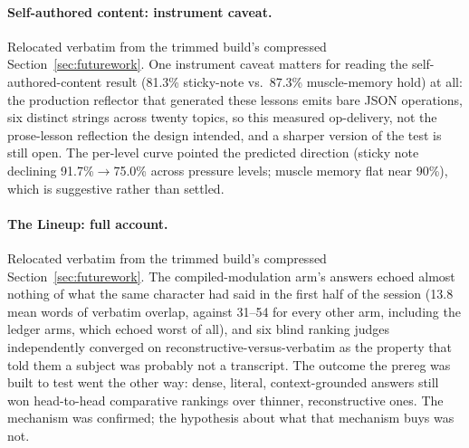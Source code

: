 \paragraph{Self-authored content: instrument caveat.} Relocated verbatim from the
trimmed build's compressed Section~\ref{sec:futurework}. One instrument caveat matters
for reading the self-authored-content result (81.3\% sticky-note vs.\ 87.3\%
muscle-memory hold) at all: the production reflector that generated these lessons
emits bare JSON operations, six distinct strings across twenty topics, so this measured
op-delivery, not the prose-lesson reflection the design intended, and a sharper version
of the test is still open. The per-level curve pointed the predicted direction (sticky
note declining 91.7\%\(\to\)75.0\% across pressure levels; muscle memory flat near
90\%), which is suggestive rather than settled.

\paragraph{The Lineup: full account.} Relocated verbatim from the trimmed build's
compressed Section~\ref{sec:futurework}. The compiled-modulation arm's answers echoed
almost nothing of what the same character had said in the first half of the session
(13.8 mean words of verbatim overlap, against 31--54 for every other arm, including the
ledger arms, which echoed worst of all), and six blind ranking judges independently
converged on reconstructive-versus-verbatim as the property that told them a subject
was probably not a transcript. The outcome the prereg was built to test went the other
way: dense, literal, context-grounded answers still won head-to-head comparative
rankings over thinner, reconstructive ones. The mechanism was confirmed; the hypothesis
about what that mechanism buys was not.
